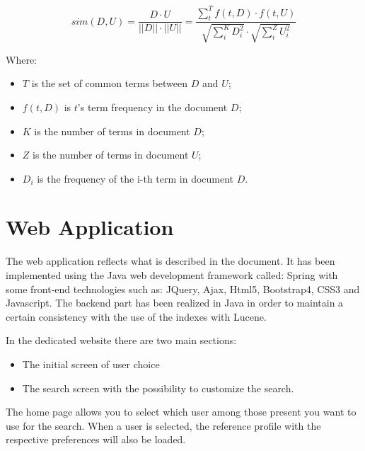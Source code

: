 \documentclass[11pt, english]{article}
\begin{document}
\begin{equation}
sim(D, U) = \frac {D \cdot U}{|| D|| \cdot || U||} = \frac{\sum_{t}^{T} f(t, D) \cdot f(t, U)}{\sqrt{\sum_{i}^{K} D_i^2} \cdot \sqrt{\sum_{i}^{Z} U_i^2}}
\end{equation}


Where:

\begin{itemize}[noitemsep]
\item $T$ is the set of common terms between $D$ and $U$;
\item $f(t, D)$ is $t$'s term frequency in the document $D$;
\item $K$ is the number of terms in document $D$;
\item $Z$ is the number of terms in document $U$;
\item $D_i$ is the frequency of the i-th term in document $D$.
\end{itemize} 




\section{Web Application}

The web application reflects what is described in the document.
It has been implemented using the Java web development framework called: Spring with some front-end technologies such as: JQuery, Ajax, Html5, Bootstrap4, CSS3 and Javascript.
The backend part has been realized in Java in order to maintain a certain consistency with the use of the indexes with Lucene.

In the dedicated website there are two main sections:
\begin{itemize}
\item The initial screen of user choice
\item The search screen with the possibility to customize the search.
\end{itemize}

The home page allows you to select which user among those present you want to use for the search.
When a user is selected, the reference profile with the respective preferences will also be loaded.
\end{document}
